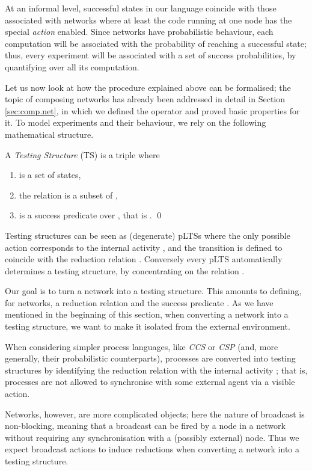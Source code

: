 \documentclass{LMCS}
\begin{document}
At an informal level, successful states in our language coincide with those associated with networks 
where at least the code running at one node has the special \emph{action}  enabled. 
Since networks have probabilistic behaviour, each computation will be associated with 
the probability  of reaching a successful state; thus, every experiment will be 
associated with a set of success probabilities, by quantifying over all its computation.

Let us now look at how the procedure explained above can be formalised; the topic 
of composing networks has already been addressed in detail in Section \ref{sec:comp.net}, 
in which we defined the operator  and proved basic properties for it. To 
model experiments and their behaviour, we rely on the following mathematical structure.

\begin{defi}\label{def:testing}
  A \emph{Testing Structure} (TS) is a triple 
 where 
\begin{enumerate}[label=(\roman*)]
\item  is a set of states,

\item the relation  is a subset of ,

\item  is a success predicate over , that is . \qed
\end{enumerate}
\end{defi}
\noindent
Testing structures can be seen as (degenerate) pLTSs where the only
possible action corresponds to the internal activity , and the
transition  is defined to coincide with the reduction
relation . 
 Conversely every pLTS automatically determines a testing structure,
by concentrating on the relation .

Our goal is to turn a network into a testing structure. This amounts to defining, 
for networks, a reduction relation and the success predicate .
As we have mentioned in the beginning of this section, when converting a 
network into a testing structure, we want to  make it 
isolated from the external environment. 

When considering simpler process languages, like \emph{CCS} or \emph{CSP} 
(and, more generally, their probabilistic counterparts), 
processes are converted into testing structures by identifying the reduction 
relation with the internal activity ; that is, processes are 
not allowed to synchronise with some external agent via a visible action. 

Networks, however, are more complicated objects; here the nature of 
broadcast is non-blocking, meaning that a broadcast can be 
fired by a node in a network without requiring any synchronisation 
with a (possibly external) node. Thus we expect broadcast 
actions to induce reductions when converting a network into a testing structure.
\end{document}
